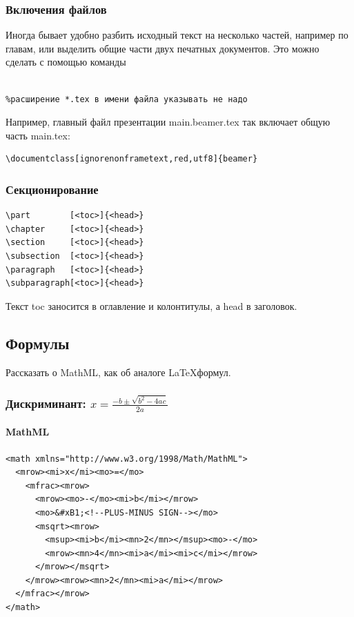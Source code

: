\begin{frame}[fragile]
\frametitle{Включения файлов}
Иногда бывает удобно разбить исходный текст на несколько частей, например по \alert{главам}, или выделить \alert{общие части} двух печатных документов. Это можно сделать с помощью команды
\begin{verbatim}

%расширение *.tex в имени файла указывать не надо
\end{verbatim}
Например, главный файл презентации main.beamer.tex так включает общую часть main.tex:
\begin{verbatim}
\documentclass[ignorenonframetext,red,utf8]{beamer}

\end{verbatim}
\end{frame}


\begin{frame}[fragile]
\frametitle{Секционирование}
%
\begin{verbatim}
\part        [<toc>]{<head>}
\chapter     [<toc>]{<head>}
\section     [<toc>]{<head>}
\subsection  [<toc>]{<head>}
\paragraph   [<toc>]{<head>}
\subparagraph[<toc>]{<head>}
\end{verbatim}
Текст \alert{toc} заносится в оглавление и колонтитулы, а \alert{head} в заголовок.
\end{frame}


\subsection{Формулы}

Рассказать о MathML, как об аналоге \LaTeX формул.
\begin{frame}[fragile]
\frametitle{Дискриминант: $x = \frac{-b \pm \sqrt{b^2 - 4ac}}{2a}$}
\framesubtitle{MathML}
%
\begin{verbatim}
<math xmlns="http://www.w3.org/1998/Math/MathML">
  <mrow><mi>x</mi><mo>=</mo>
    <mfrac><mrow> 
      <mrow><mo>-</mo><mi>b</mi></mrow>
      <mo>&#xB1;<!--PLUS-MINUS SIGN--></mo>
      <msqrt><mrow>
        <msup><mi>b</mi><mn>2</mn></msup><mo>-</mo>
        <mrow><mn>4</mn><mi>a</mi><mi>c</mi></mrow>
      </mrow></msqrt>
    </mrow><mrow><mn>2</mn><mi>a</mi></mrow>
  </mfrac></mrow>
</math>
\end{verbatim}
\end{frame}


